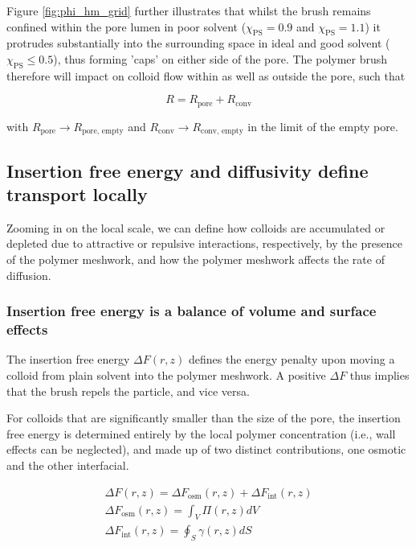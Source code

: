 \documentclass[12pt, a4paper]{article}
\begin{document}
Figure \ref{fig:phi_hm_grid} further illustrates that whilst the brush remains confined within the pore lumen in poor solvent ($\chi_{\text{PS}}=0.9$ and $\chi_{\text{PS}}=1.1$) 
it protrudes substantially into the surrounding space in ideal and good solvent ($\chi_{\text{PS}}\le0.5$), thus forming 'caps' on either side of the pore.  
The polymer brush therefore will impact on colloid flow within as well as outside the pore, such that

\begin{equation}
    R=R_{\text{pore}}+R_{\text{conv}}
    \label{eq:R_tot_tot}
\end{equation}
    
\noindent with $R_{\text{pore}}\rightarrow R_{\text{pore, empty}}$ and $R_{\text{conv}}\rightarrow R_{\text{conv, empty}}$ in the limit of the empty pore. 


\subsection{Insertion free energy and diffusivity define transport locally}

Zooming in on the local scale, we can define how colloids are accumulated or depleted due to attractive or repulsive interactions, respectively, by the presence of the polymer meshwork, 
and how the polymer meshwork affects the rate of diffusion.

\subsubsection{Insertion free energy is a balance of volume and surface effects}

The insertion free energy $\Delta F(r,z)$ defines the energy penalty upon moving a colloid from plain solvent into the polymer meshwork.
A positive $\Delta F$ thus implies that the brush repels the particle, and vice versa.

For colloids that are significantly smaller than the size of the pore, the insertion free energy is determined entirely by the local polymer concentration (i.e., wall effects can be neglected), 
and made up of two distinct contributions, one osmotic and the other interfacial.

\begin{eqnarray}
    \Delta F (r,z)= \Delta F_{\text{osm}}(r,z) + \Delta F_{\text{int}}(r,z)
    \\
    \Delta F_{\text{osm}}(r,z) = \int_{V} \Pi(r,z) dV
    \\
    \Delta F_{\text{int}}(r,z) = \oint_{S} \gamma (r,z) dS
    \label{eq:Delta_F}
\end{eqnarray}
\end{document}

